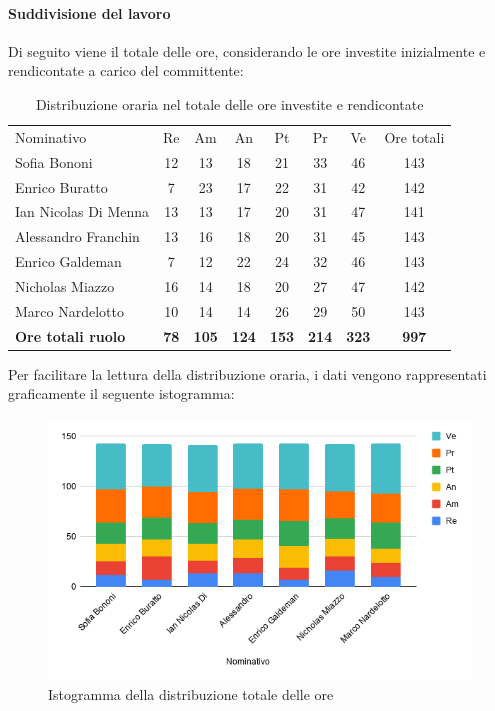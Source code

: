 \documentclass[../piano-di-progetto.tex]{subfiles}
\begin{document}
  \paragraph{Suddivisione del lavoro}
  Di seguito viene il totale delle ore, considerando le ore investite inizialmente e rendicontate a carico del committente:
  \begin{table}[H]
    \begin{tabular}{lccccccc}
    Nominativo                & Re          & Am           & An           & Pt           & Pr           & Ve           & Ore totali   \\
    Sofia Bononi              & 12          & 13           & 18           & 21           & 33           & 46           & 143          \\
    Enrico Buratto            & 7           & 23           & 17           & 22           & 31           & 42           & 142          \\
    Ian Nicolas Di Menna      & 13          & 13           & 17           & 20           & 31           & 47           & 141          \\
    Alessandro Franchin       & 13          & 16           & 18           & 20           & 31           & 45           & 143          \\
    Enrico Galdeman           & 7           & 12           & 22           & 24           & 32           & 46           & 143          \\
    Nicholas Miazzo           & 16          & 14           & 18           & 20           & 27           & 47           & 142          \\
    Marco Nardelotto          & 10          & 14           & 14           & 26           & 29           & 50           & 143          \\
    \textbf{Ore totali ruolo} & \textbf{78} & \textbf{105} & \textbf{124} & \textbf{153} & \textbf{214} & \textbf{323} & \textbf{997}
    \end{tabular}
    \caption{Distribuzione oraria nel totale delle ore investite e rendicontate}
    \end{table}

    Per facilitare la lettura della distribuzione oraria, i dati vengono rappresentati graficamente il seguente istogramma:
    \begin{figure}[H]
      \centering
      \includegraphics[width=12cm]{img/ore-totale.png}
      \caption{Istogramma della distribuzione totale delle ore}
      \label{fig:ore-totali}
    \end{figure}
\end{document}
